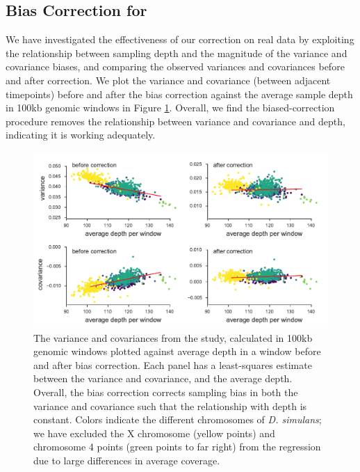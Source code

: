 \documentclass[11pt]{article}
\begin{document}
\subsection{Bias Correction for \textcite{Barghi2019-qy}}

We have investigated the effectiveness of our correction on real data by
exploiting the relationship between sampling depth and the magnitude of the
variance and covariance biases, and comparing the observed variances and
covariances before and after correction. We plot the variance and covariance
(between adjacent timepoints) before and after the bias correction against the
average sample depth in 100kb genomic windows in Figure
\ref{suppfig:barghi-correction}. Overall, we find the biased-correction
procedure removes the relationship between variance and covariance and depth, indicating it is working adequately.

\begin{figure}[!ht]
  \centering
  \includegraphics[]{figures/barghi-correction-plot.pdf}

  \caption{The variance and covariances from the \textcite{Barghi2019-qy}
    study, calculated in 100kb genomic windows plotted against average depth in
    a window before and after bias correction.  Each panel has a least-squares
    estimate between the variance and covariance, and the average depth.
    Overall, the bias correction corrects sampling bias in both the variance
    and covariance such that the relationship with depth is constant. Colors
    indicate the different chromosomes of \emph{D. simulans}; we have excluded
  the X chromosome (yellow points) and chromosome 4 points (green points to far
right) from the regression due to large differences in average coverage.}

  \label{suppfig:barghi-correction}
\end{figure}
\end{document}
